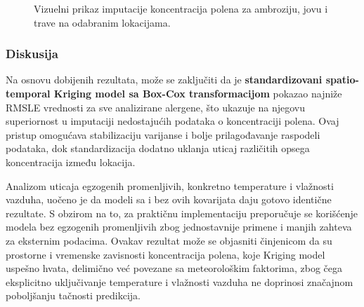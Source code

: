 \documentclass[12pt]{article}
\begin{document}
\begin{figure}[H]
    \centering
    \caption{Vizuelni prikaz imputacije koncentracija polena za ambroziju, jovu i trave na odabranim lokacijama.}
    \label{fig:imputacija}

\end{figure}



\subsubsection{Diskusija}

Na osnovu dobijenih rezultata, može se zaključiti da je \textbf{standardizovani spatio-temporal Kriging model sa Box-Cox transformacijom} pokazao najniže RMSLE vrednosti za sve analizirane alergene, što ukazuje na njegovu superiornost u imputaciji nedostajućih podataka o koncentraciji polena. Ovaj pristup omogućava stabilizaciju varijanse i bolje prilagođavanje raspodeli podataka, dok standardizacija dodatno uklanja uticaj različitih opsega koncentracija između lokacija.

Analizom uticaja egzogenih promenljivih, konkretno temperature i vlažnosti vazduha, uočeno je da modeli sa i bez ovih kovarijata daju gotovo identične rezultate. S obzirom na to, za praktičnu implementaciju preporučuje se korišćenje modela bez egzogenih promenljivih zbog jednostavnije primene i manjih zahteva za eksternim podacima. Ovakav rezultat može se objasniti činjenicom da su prostorne i vremenske zavisnosti koncentracija polena, koje Kriging model uspešno hvata, delimično već povezane sa meteorološkim faktorima, zbog čega eksplicitno uključivanje temperature i vlažnosti vazduha ne doprinosi značajnom poboljšanju tačnosti predikcija.
\end{document}
